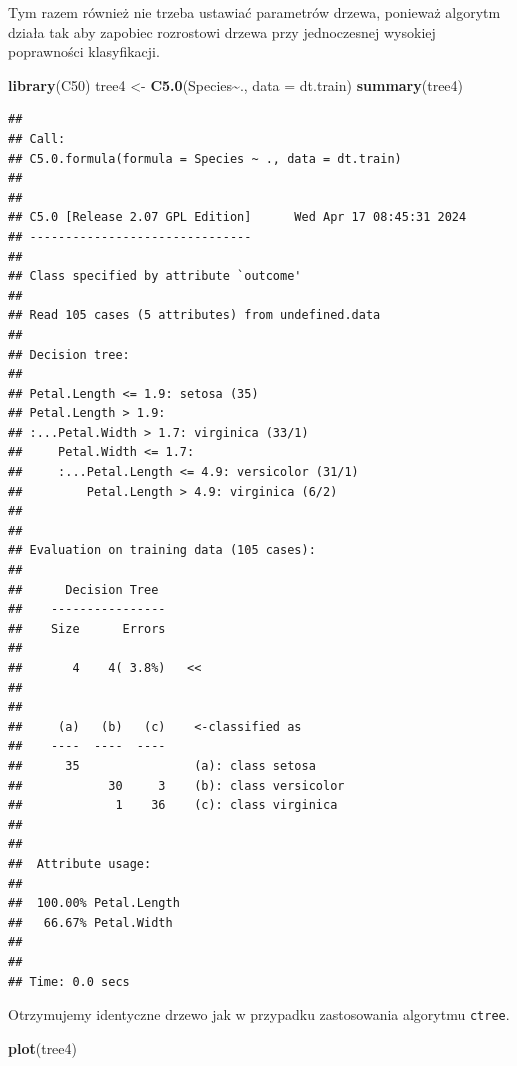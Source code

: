 \documentclass[
]{book}
\newenvironment{Shaded}{\begin{snugshade}}{\end{snugshade}}
\newcommand{\AttributeTok}[1]{\textcolor[rgb]{0.13,0.29,0.53}{#1}}
\newcommand{\FunctionTok}[1]{\textcolor[rgb]{0.13,0.29,0.53}{\textbf{#1}}}
\newcommand{\NormalTok}[1]{#1}
\newcommand{\OtherTok}[1]{\textcolor[rgb]{0.56,0.35,0.01}{#1}}
\newcommand{\SpecialCharTok}[1]{\textcolor[rgb]{0.81,0.36,0.00}{\textbf{#1}}}
\theoremstyle{plain}
\theoremstyle{definition}
\theoremstyle{definition}
\theoremstyle{definition}
\theoremstyle{definition}
\theoremstyle{definition}
\theoremstyle{remark}
\begin{document}
Tym razem również nie trzeba ustawiać parametrów drzewa, ponieważ algorytm działa tak aby zapobiec rozrostowi drzewa przy jednoczesnej wysokiej poprawności klasyfikacji.

\begin{Shaded}
\begin{Highlighting}[]
\FunctionTok{library}\NormalTok{(C50)}
\NormalTok{tree4 }\OtherTok{\textless{}{-}} \FunctionTok{C5.0}\NormalTok{(Species}\SpecialCharTok{\textasciitilde{}}\NormalTok{., }\AttributeTok{data =}\NormalTok{ dt.train)}
\FunctionTok{summary}\NormalTok{(tree4)}
\end{Highlighting}
\end{Shaded}

\begin{verbatim}
## 
## Call:
## C5.0.formula(formula = Species ~ ., data = dt.train)
## 
## 
## C5.0 [Release 2.07 GPL Edition]      Wed Apr 17 08:45:31 2024
## -------------------------------
## 
## Class specified by attribute `outcome'
## 
## Read 105 cases (5 attributes) from undefined.data
## 
## Decision tree:
## 
## Petal.Length <= 1.9: setosa (35)
## Petal.Length > 1.9:
## :...Petal.Width > 1.7: virginica (33/1)
##     Petal.Width <= 1.7:
##     :...Petal.Length <= 4.9: versicolor (31/1)
##         Petal.Length > 4.9: virginica (6/2)
## 
## 
## Evaluation on training data (105 cases):
## 
##      Decision Tree   
##    ----------------  
##    Size      Errors  
## 
##       4    4( 3.8%)   <<
## 
## 
##     (a)   (b)   (c)    <-classified as
##    ----  ----  ----
##      35                (a): class setosa
##            30     3    (b): class versicolor
##             1    36    (c): class virginica
## 
## 
##  Attribute usage:
## 
##  100.00% Petal.Length
##   66.67% Petal.Width
## 
## 
## Time: 0.0 secs
\end{verbatim}

Otrzymujemy identyczne drzewo jak w przypadku zastosowania algorytmu \texttt{ctree}.

\begin{Shaded}
\begin{Highlighting}[]
\FunctionTok{plot}\NormalTok{(tree4)}
\end{Highlighting}
\end{Shaded}
\end{document}
